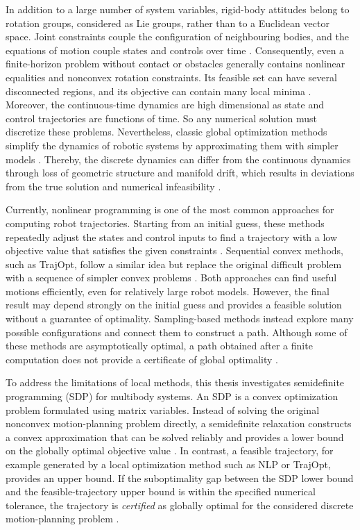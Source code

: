 In addition to a large number of system variables, rigid-body attitudes
belong to rotation groups, considered as Lie groups, rather than to a Euclidean vector
space. Joint constraints couple the configuration of neighbouring bodies, and the
equations of motion couple states and controls over time \cite{Sangli2025}. Consequently, even a
finite-horizon problem without contact or obstacles generally contains nonlinear
equalities and nonconvex rotation constraints. Its feasible set can have several
disconnected regions, and its objective can contain many local minima \cite{Kang_2026Fast}.
Moreover, the continuous-time dynamics are high dimensional as state and control trajectories
are functions of time. So any numerical
solution must discretize these problems. Nevertheless, classic global optimization methods simplify
the dynamics of robotic systems by approximating them with simpler models \cite{Sangli2025}. 
Thereby, the discrete dynamics can differ from the continuous dynamics through 
loss of geometric structure and manifold drift, 
which results in deviations from the true solution and 
numerical infeasibility \cite{Marsden2001}.

Currently, nonlinear programming is one of the most common approaches for computing robot 
trajectories. Starting from an initial guess, these methods repeatedly adjust the states and 
control inputs to find a trajectory with a low objective value that satisfies the given 
constraints \cite{Betts1998TrajectoryOptimization,tedrake_underactuated}. Sequential convex 
methods, such as TrajOpt, follow a similar idea but replace the original difficult problem 
with a sequence of simpler convex problems \cite{Schulman2014TrajOpt}. Both approaches can 
find useful motions efficiently, even for relatively large robot models. However, the final 
result may depend strongly on the initial guess and provides a feasible solution without a 
guarantee of optimality.
Sampling-based methods instead explore many possible configurations and connect them to 
construct a path. Although some of these methods are asymptotically optimal, a path obtained 
after a finite computation does not provide a certificate of global optimality 
\cite{KaramanFrazzoli2011Sampling}.

To address the limitations of local methods, this thesis investigates semidefinite 
programming (SDP) for multibody systems. An SDP is a convex optimization problem formulated
using matrix variables. Instead of solving the original nonconvex motion-planning problem directly, a semidefinite 
relaxation constructs a convex approximation that can be solved reliably and provides a lower 
bound on the globally optimal objective value \cite{VandenbergheBoyd1996SDP,Lasserre2001Global}. 
In contrast, a feasible trajectory, for example generated by a local optimization method
such as NLP or TrajOpt, provides an upper bound. 
If the suboptimality gap between the SDP lower bound and the feasible-trajectory 
upper bound is within the specified numerical tolerance, the trajectory is \emph{certified} 
as globally optimal for the considered discrete motion-planning problem \cite{Sangli2025}.

